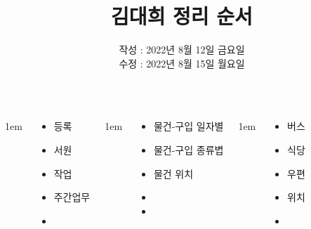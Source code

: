 \documentclass[	20pt, 
							a0paper, 
							landscape,
							margin=0mm, %
							innermargin=10mm,  		%
							blockverticalspace=4mm, %
							colspace=5mm, 
							subcolspace=0mm
							]{tikzposter}
\title{ 김대희 정리 순서 }
\author{ 		작성 : 2022년 8월 12일 금요일 \\
				수정 : 2022년 8월 15일 월요일 }
\begin{document}
	\maketitle[
					width=841mm,
					linewidth = 2mm,
					innersep=4mm,
					titletotopverticalspace=2mm, %
					titletoblockverticalspace=2mm, %
					titletextscale =4, 
				]


	\begin{columns}


			{
					\setlength{\leftmargini}{4em}
					\setlength{\labelsep} {1em}
				\begin{LARGE}
					\begin{itemize}
					\item 등록 
					\item 서원
					\item 작업
					\item 주간업무
					\item 
					\end{itemize}
				\end{LARGE}
			} %


			{
					\setlength{\leftmargini}{4em}
					\setlength{\labelsep} {1em}
				\begin{LARGE}
					\begin{itemize}
					\item 물건-구입 일자별 
					\item 물건-구입 종류볍
					\item 물건 위치
					\item
					\item
					\end{itemize}
				\end{LARGE}
			} %


			{
					\setlength{\leftmargini}{4em}
					\setlength{\labelsep} {1em}
				\begin{LARGE}
					\begin{itemize}
					\item 버스
					\item 식당
					\item 우편
					\item 위치
					\item
					\end{itemize}
				\end{LARGE}
			} %



\end{columns}
\end{document}
